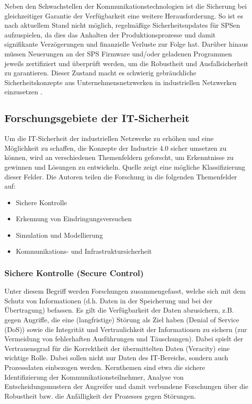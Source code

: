 Neben den Schwachstellen der Kommunikationstechnologien ist die Sicherung bei gleichzeitiger Garantie der Verfügbarkeit eine weitere Herausforderung. 
So ist es nach aktuellem Stand nicht möglich, regelmäßige Sicherheitsupdates für SPSen aufzuspielen, da dies das Anhalten der Produktionsprozesse und damit signifikante Verzögerungen und finanzielle Verluste zur Folge hat. Darüber hinaus müssen Neuerungen an der SPS Firmware und/oder geladenen Programmen jeweils zertifiziert und überprüft werden, um die Robustheit und Ausfallsicherheit zu garantieren. Dieser Zustand macht es schwierig gebräuchliche Sicherheitskonzepte aus Unternehmensnetzwerken in industriellen Netzwerken einzusetzen \citep{6622964}.


\subsection{Forschungsgebiete der IT-Sicherheit}
Um die IT-Sicherheit der industriellen Netzwerke zu erhöhen und eine Möglichkeit zu schaffen, die Konzepte der Industrie 4.0 sicher umsetzen zu können, wird an verschiedenen Themenfeldern geforscht, um Erkenntnisse zu gewinnen und Lösungen zu entwickeln. Quelle \citep{6622964} zeigt eine mögliche Klassifizierung dieser Felder. Die Autoren teilen die Forschung in die folgenden Themenfelder auf:
\begin{itemize}
\item Sichere Kontrolle
\item Erkennung von Eindringungsversuchen
\item Simulation und Modellierung
\item Kommunikations- und Infrastruktursicherheit
\end{itemize}

\subsubsection{Sichere Kontrolle (\glqq Secure Control\grqq  )} 
Unter diesem Begriff werden Forschungen zusammengefasst, welche sich mit dem Schutz von Informationen (d.h. Daten in der Speicherung und bei der Übertragung) befassen. Es gilt die Verfügbarkeit der Daten abzusichern, z.B. gegen Angriffe, die eine (langfristige) Störung als Ziel haben (Denial of Service (DoS)) sowie die Integrität und Vertraulichkeit der Informationen zu sichern (zur Vermeidung von fehlerhaften Ausführungen und Täuschungen). Dabei spielt der Vertrauensgrad für die Korrektheit der übermittelten Daten (\glqq Veracity\grqq  ) eine wichtige Rolle. Dabei sollen nicht nur Daten des IT-Bereichs, sondern auch Prozessdaten einbezogen werden. Kernthemen sind etwa die sichere Identifizierung der Kommunikationsteilnehmer, Analyse von Entscheidungsmustern der Angreifer und damit verbundene Forschungen über die Robustheit bzw. die Anfälligkeit der Prozesses gegen Störungen.

